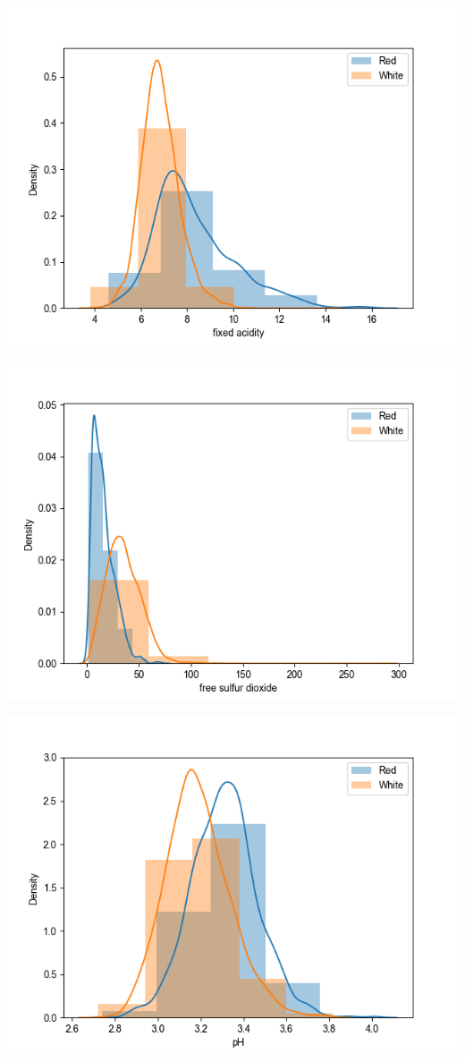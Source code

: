 \documentclass[12pt, letterpaper]{article}
\begin{document}
\includegraphics[scale=\myscale]{class_dist_fixed_acidity.png}

\includegraphics[scale=\myscale]{class_dist_free_sulfur_dioxide.png}

\includegraphics[scale=\myscale]{class_dist_pH.png}
\end{document}
